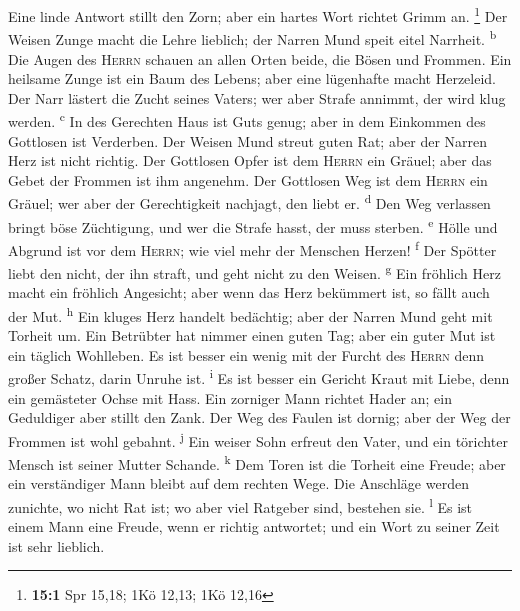  Eine linde Antwort stillt den Zorn; aber ein hartes Wort
richtet Grimm an. \footnote{\textbf{15:1} Spr 15,18; 1Kö 12,13; 1Kö
  12,16}  Der Weisen Zunge macht die Lehre lieblich; der
Narren Mund speit eitel Narrheit. \textsuperscript{b}  Die
Augen des \textsc{Herrn} schauen an allen Orten beide, die Bösen und
Frommen.  Ein heilsame Zunge ist ein Baum des Lebens; aber
eine lügenhafte macht Herzeleid.  Der Narr lästert die
Zucht seines Vaters; wer aber Strafe annimmt, der wird klug werden.
\textsuperscript{c}  In des Gerechten Haus ist Guts genug;
aber in dem Einkommen des Gottlosen ist Verderben.  Der
Weisen Mund streut guten Rat; aber der Narren Herz ist nicht richtig.
 Der Gottlosen Opfer ist dem \textsc{Herrn} ein Gräuel;
aber das Gebet der Frommen ist ihm angenehm.  Der
Gottlosen Weg ist dem \textsc{Herrn} ein Gräuel; wer aber der
Gerechtigkeit nachjagt, den liebt er. \textsuperscript{d}
 Den Weg verlassen bringt böse Züchtigung, und wer die
Strafe hasst, der muss sterben. \textsuperscript{e} 
Hölle und Abgrund ist vor dem \textsc{Herrn}; wie viel mehr der Menschen
Herzen! \textsuperscript{f}  Der Spötter liebt den nicht,
der ihn straft, und geht nicht zu den Weisen. \textsuperscript{g}
 Ein fröhlich Herz macht ein fröhlich Angesicht; aber
wenn das Herz bekümmert ist, so fällt auch der Mut. \textsuperscript{h}
 Ein kluges Herz handelt bedächtig; aber der Narren Mund
geht mit Torheit um.  Ein Betrübter hat nimmer einen
guten Tag; aber ein guter Mut ist ein täglich Wohlleben. 
Es ist besser ein wenig mit der Furcht des \textsc{Herrn} denn großer
Schatz, darin Unruhe ist. \textsuperscript{i}  Es ist
besser ein Gericht Kraut mit Liebe, denn ein gemästeter Ochse mit Hass.
 Ein zorniger Mann richtet Hader an; ein Geduldiger aber
stillt den Zank.  Der Weg des Faulen ist dornig; aber der
Weg der Frommen ist wohl gebahnt. \textsuperscript{j} 
Ein weiser Sohn erfreut den Vater, und ein törichter Mensch ist seiner
Mutter Schande. \textsuperscript{k}  Dem Toren ist die
Torheit eine Freude; aber ein verständiger Mann bleibt auf dem rechten
Wege.  Die Anschläge werden zunichte, wo nicht Rat ist;
wo aber viel Ratgeber sind, bestehen sie. \textsuperscript{l}
 Es ist einem Mann eine Freude, wenn er richtig
antwortet; und ein Wort zu seiner Zeit ist sehr lieblich.
